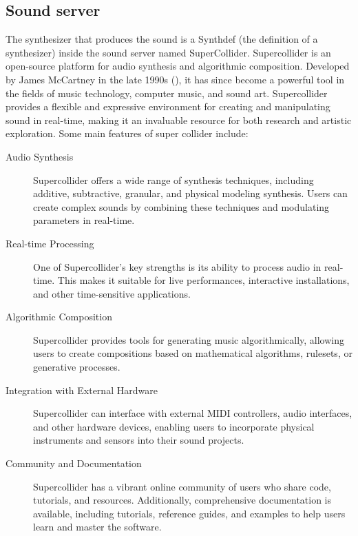 \documentclass[a4paper]{book}
\begin{document}
\subsection{Sound server}
The synthesizer that produces the sound is a Synthdef (the definition of a synthesizer) inside the sound server named SuperCollider. Supercollider is an open-source platform for audio synthesis and algorithmic composition. Developed by James McCartney in the late 1990s (\cite{scBook}), it has since become a powerful tool in the fields of music technology, computer music, and sound art. Supercollider provides a flexible and expressive environment for creating and manipulating sound in real-time, making it an invaluable resource for both research and artistic exploration. Some main features of super collider include:

\begin{description}
	\item[Audio Synthesis] Supercollider offers a wide range of synthesis techniques, including additive, subtractive, granular, and physical modeling synthesis. Users can create complex sounds by combining these techniques and modulating parameters in real-time.
	\item[Real-time Processing] One of Supercollider's key strengths is its ability to process audio in real-time. This makes it suitable for live performances, interactive installations, and other time-sensitive applications.
	\item[Algorithmic Composition] Supercollider provides tools for generating music algorithmically, allowing users to create compositions based on mathematical algorithms, rulesets, or generative processes.
	\item[Integration with External Hardware] Supercollider can interface with external MIDI controllers, audio interfaces, and other hardware devices, enabling users to incorporate physical instruments and sensors into their sound projects.
	\item[Community and Documentation] Supercollider has a vibrant online community of users who share code, tutorials, and resources. Additionally, comprehensive documentation is available, including tutorials, reference guides, and examples to help users learn and master the software.
	
	
\end{description}
\end{document}
